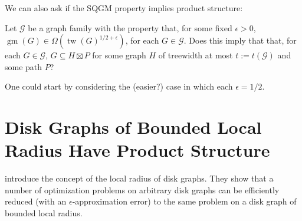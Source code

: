 \documentclass{patmorin}
\DeclareMathOperator{\tw}{tw}
\DeclareMathOperator{\gm}{gm}
\begin{document}
%
%
%
%
%




We can also ask if the SQGM property implies product structure:
 
\begin{op}
  Let $\mathcal{G}$ be a graph family with the property that, for some fixed $\epsilon >0$, $\gm(G)\in\Omega(\tw(G)^{1/2+\epsilon})$, for each $G\in\mathcal{G}$.  Does this imply that that, for each $G\in\mathcal{G}$, $G\subseteq H\boxtimes P$ for some graph $H$ of treewidth at most $t:=t(\mathcal{G})$ and some path $P$?
\end{op}

One could start by considering the (easier?) case in which each $\epsilon = 1/2$.


\newpage
\section{Disk Graphs of Bounded Local Radius Have Product Structure}

\citet{lokshtanov.panolan:framework} introduce the concept of the local radius of disk graphs.  They show that a number of optimization problems on arbitrary disk graphs can be efficiently reduced (with an $\epsilon$-approximation error) to the same problem on a disk graph of bounded local radius.
\end{document}
